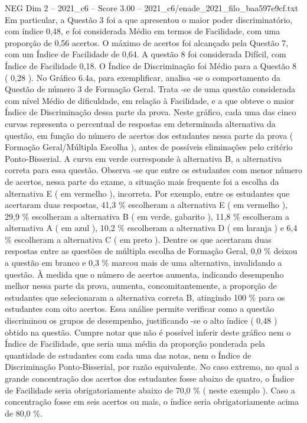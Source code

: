 \begin{textsample}{NEG Dim 2 – 2021\_c6 – Score 3.00 – 2021\_c6/enade\_2021\_filo\_baa597e9cf.txt}
Em particular, a Questão 3 foi a que apresentou o maior poder discriminatório, com índice 0,48, e foi considerada Médio em termos de Facilidade, com uma proporção de 0,56 acertos.
O máximo de acertos foi alcançado pela Questão 7, com um Índice de Facilidade de 0,64.
A questão 8 foi considerada Difícil, com Índice de Facilidade 0,18.
O Índice de Discriminação foi Médio para a Questão 8 ( 0,28 ).
No Gráfico 6.4a, para exemplificar, analisa -se o comportamento da Questão de número 3 de Formação Geral.
Trata -se de uma questão considerada com nível Médio de dificuldade, em relação à Facilidade, e a que obteve o maior Índice de Discriminação dessa parte da prova.
Neste gráfico, cada uma das cinco curvas representa o percentual de respostas em determinada alternativa da questão, em função do número de acertos dos estudantes nessa parte da prova ( Formação Geral/Múltipla Escolha ), antes de possíveis eliminações pelo critério Ponto-Bisserial.
A curva em verde corresponde à alternativa B, a alternativa correta para essa questão.
Observa -se que entre os estudantes com menor número de acertos, nessa parte do exame, a situação mais frequente foi a escolha da alternativa E ( em vermelho ), incorreta.
Por exemplo, entre os estudantes que acertaram duas respostas, 41,3 \% escolheram a alternativa E ( em vermelho ), 29,9 \% escolheram a alternativa B ( em verde, gabarito ), 11,8 \% escolheram a alternativa A ( em azul ), 10,2 \% escolheram a alternativa D ( em laranja ) e 6,4 \% escolheram a alternativa C ( em preto ).
Dentre os que acertaram duas respostas entre as questões de múltipla escolha de Formação Geral, 0,0 \% deixou a questão em branco e 0,3 \% marcou mais de uma alternativa, invalidando a questão.
À medida que o número de acertos aumenta, indicando desempenho melhor nessa parte da prova, aumenta, concomitantemente, a proporção de estudantes que selecionaram a alternativa correta B, atingindo 100 \% para os estudantes com oito acertos.
Essa análise permite verificar como a questão discriminou os grupos de desempenho, justificando -se o alto índice ( 0,48 ) obtido na questão.
Cumpre notar que não é possível inferir deste gráfico nem o Índice de Facilidade, que seria uma média da proporção ponderada pela quantidade de estudantes com cada uma das notas, nem o Índice de Discriminação Ponto-Bisserial, por razão equivalente.
No caso extremo, no qual a grande concentração dos acertos dos estudantes fosse abaixo de quatro, o Índice de Facilidade seria obrigatoriamente abaixo de 70,0 \% ( neste exemplo ).
Caso a concentração fosse em seis acertos ou mais, o índice seria obrigatoriamente acima de 80,0 \%.

\end{textsample}
